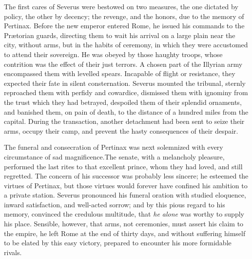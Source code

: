 
The first cares of Severus were bestowed on two measures, the one
dictated by policy, the other by decency; the revenge, and the
honors, due to the memory of Pertinax. Before the new emperor
entered Rome, he issued his commands to the Prætorian guards,
directing them to wait his arrival on a large plain near the
city, without arms, but in the habits of ceremony, in which they
were accustomed to attend their sovereign. He was obeyed by those
haughty troops, whose contrition was the effect of their just
terrors. A chosen part of the Illyrian army encompassed them with
levelled spears. Incapable of flight or resistance, they expected
their fate in silent consternation. Severus mounted the tribunal,
sternly reproached them with perfidy and cowardice, dismissed
them with ignominy from the trust which they had betrayed,
despoiled them of their splendid ornaments, and banished them, on
pain of death, to the distance of a hundred miles from the
capital. During the transaction, another detachment had been sent
to seize their arms, occupy their camp, and prevent the hasty
consequences of their despair.\footnotemark[38]


The funeral and consecration of Pertinax was next solemnized with
every circumstance of sad magnificence.\footnotemark[39] The senate, with a
melancholy pleasure, performed the last rites to that excellent
prince, whom they had loved, and still regretted. The concern of
his successor was probably less sincere; he esteemed the virtues
of Pertinax, but those virtues would forever have confined his
ambition to a private station. Severus pronounced his funeral
oration with studied eloquence, inward satisfaction, and
well-acted sorrow; and by this pious regard to his memory,
convinced the credulous multitude, that \textit{he alone} was worthy to
supply his place. Sensible, however, that arms, not ceremonies,
must assert his claim to the empire, he left Rome at the end of
thirty days, and without suffering himself to be elated by this
easy victory, prepared to encounter his more formidable rivals.

